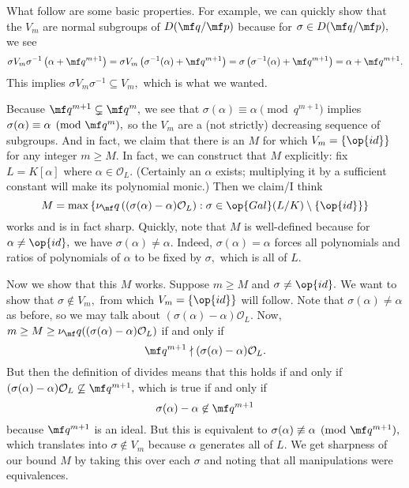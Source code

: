 What follow are some basic properties. For example, we can quickly show that the $V_m$ are normal subgroups of $D(\mf q/\mf p)$ because for $\sigma\in D(\mf q/\mf p),$ we see
\[\sigma V_m\sigma^{-1}\left(\alpha+\mf q^{m+1}\right)=\sigma V_m\left(\sigma^{-1}(\alpha)+\mf q^{m+1}\right)=\sigma\left(\sigma^{-1}(\alpha)+\mf q^{m+1}\right)=\alpha+\mf q^{m+1}.\]
This implies $\sigma V_m\sigma^{-1}\subseteq V_m,$ which is what we wanted.

Because $\mf q^{m+1}\subsetneq\mf q^m,$ we see that $\sigma(\alpha)\equiv\alpha\pmod{q^{m+1}}$ implies $\sigma(\alpha)\equiv\alpha\pmod{\mf q^m},$ so the $V_m$ are a (not strictly) decreasing sequence of subgroups. And in fact, we claim that there is an $M$ for which $V_m=\{\op{id}\}$ for any integer $m\ge M.$ In fact, we can construct that $M$ explicitly: fix $L=K[\alpha]$ where $\alpha\in\mathcal O_L.$ (Certainly an $\alpha$ exists; multiplying it by a sufficient constant will make its polynomial monic.) Then we claim/I think
\[M=\max\left\{\nu_\mf q\left((\sigma(\alpha)-\alpha)\mathcal O_L\right):\sigma\in\op{Gal}(L/K)\setminus\{\op{id}\}\right\}\]
works and is in fact sharp. Quickly, note that $M$ is well-defined because for $\alpha\ne\op{id},$ we have $\sigma(\alpha)\ne\alpha.$ Indeed, $\sigma(\alpha)=\alpha$ forces all polynomials and ratios of polynomials of $\alpha$ to be fixed by $\sigma,$ which is all of $L.$

Now we show that this $M$ works. Suppose $m\ge M$ and $\sigma\ne\op{id}.$ We want to show that $\sigma\not\in V_m,$ from which $V_m=\{\op{id}\}$ will follow. Note that $\sigma(\alpha)\ne\alpha$ as before, so we may talk about $(\sigma(\alpha)-\alpha)\mathcal O_L.$ Now, $m\ge M\ge\nu_\mf q((\sigma(\alpha)-\alpha)\mathcal O_L)$ if and only if
\[\mf q^{m+1}\nmid(\sigma(\alpha)-\alpha)\mathcal O_L.\]
But then the definition of divides means that this holds if and only if $(\sigma(\alpha)-\alpha)\mathcal O_L\not\subseteq\mf q^{m+1},$ which is true if and only if
\[\sigma(\alpha)-\alpha\not\in\mf q^{m+1}\]
because $\mf q^{m+1}$ is an ideal. But this is equivalent to $\sigma(\alpha)\not\equiv\alpha\pmod{\mf q^{m+1}},$ which translates into $\sigma\not\in V_m$ because $\alpha$ generates all of $L.$ We get sharpness of our bound $M$ by taking this over each $\sigma$ and noting that all manipulations were equivalences.

